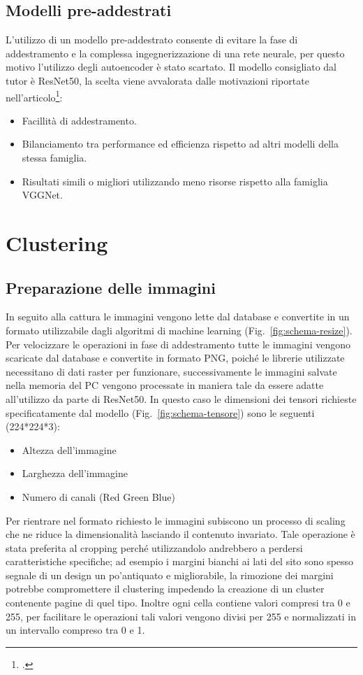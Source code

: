 \subsection{Modelli pre-addestrati}
L'utilizzo di un modello pre-addestrato consente di evitare la fase di addestramento e la complessa ingegnerizzazione di una rete neurale, per questo motivo l'utilizzo degli autoencoder è stato scartato.
Il modello consigliato dal tutor è ResNet50, la scelta viene avvalorata dalle motivazioni riportate nell'articolo\footcite{site:why-resnet}:
\begin{itemize}
  \item Facillità di addestramento.
  \item Bilanciamento tra performance ed efficienza rispetto ad altri modelli della stessa famiglia.
  \item Risultati simili o migliori utilizzando meno risorse rispetto alla famiglia VGGNet. 
\end{itemize}

\section{Clustering}
\subsection{Preparazione delle immagini}
In seguito alla cattura le immagini vengono lette dal database e convertite in un formato utilizzabile dagli algoritmi di machine learning (Fig.~\ref{fig:schema-resize}).
Per velocizzare le operazioni in fase di addestramento tutte le immagini vengono scaricate dal database e convertite in formato PNG, poiché le librerie utilizzate necessitano di dati raster per funzionare, successivamente le immagini salvate nella memoria del PC vengono processate in maniera tale da essere adatte all'utilizzo da parte di ResNet50.
In questo caso le dimensioni dei tensori richieste specificatamente dal modello (Fig.~\ref{fig:schema-tensore}) sono le seguenti (224*224*3):
\begin{itemize}
  \item Altezza dell'immagine
  \item Larghezza dell'immagine 
  \item Numero di canali (Red Green Blue)
\end{itemize}
Per rientrare nel formato richiesto le immagini subiscono un processo di scaling che ne riduce la dimensionalità lasciando il contenuto invariato.
Tale operazione è stata preferita al cropping perché utilizzandolo andrebbero a perdersi caratteristiche specifiche; ad esempio i margini bianchi ai lati del sito sono spesso segnale di un design un po'antiquato e migliorabile,  
la rimozione dei margini potrebbe compromettere il clustering impedendo la creazione di un cluster contenente pagine di quel tipo.
Inoltre ogni cella contiene valori compresi tra 0 e 255, per facilitare le operazioni tali valori vengono divisi per 255 e normalizzati in un intervallo compreso tra 0 e 1.


